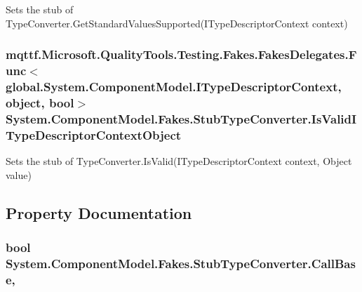 Sets the stub of Type\-Converter.\-Get\-Standard\-Values\-Supported(\-I\-Type\-Descriptor\-Context context)

\hypertarget{class_system_1_1_component_model_1_1_fakes_1_1_stub_type_converter_ad5af0f8e264721b6120bfdb315f6221d}{
\subsubsection[{Is\-Valid\-I\-Type\-Descriptor\-Context\-Object}]{\setlength{\rightskip}{0pt plus 5cm}mqttf.\-Microsoft.\-Quality\-Tools.\-Testing.\-Fakes.\-Fakes\-Delegates.\-Func$<$global.\-System.\-Component\-Model.\-I\-Type\-Descriptor\-Context, object, bool$>$ System.\-Component\-Model.\-Fakes.\-Stub\-Type\-Converter.\-Is\-Valid\-I\-Type\-Descriptor\-Context\-Object}}\label{class_system_1_1_component_model_1_1_fakes_1_1_stub_type_converter_ad5af0f8e264721b6120bfdb315f6221d}


Sets the stub of Type\-Converter.\-Is\-Valid(\-I\-Type\-Descriptor\-Context context, Object value)



\subsection{Property Documentation}
\hypertarget{class_system_1_1_component_model_1_1_fakes_1_1_stub_type_converter_a374c7283e95e7a79ec0587400d53cf5c}{
\subsubsection[{Call\-Base}]{\setlength{\rightskip}{0pt plus 5cm}bool System.\-Component\-Model.\-Fakes.\-Stub\-Type\-Converter.\-Call\-Base\hspace{0.3cm}{\ttfamily [get]}, {\ttfamily [set]}}}\label{class_system_1_1_component_model_1_1_fakes_1_1_stub_type_converter_a374c7283e95e7a79ec0587400d53cf5c}


